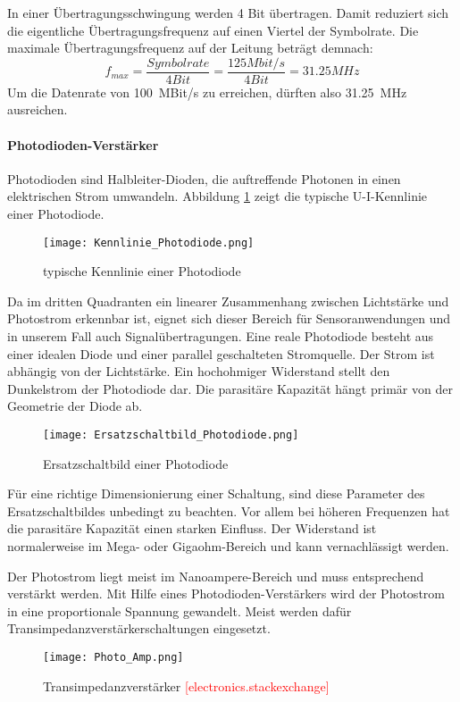 In einer Übertragungsschwingung werden 4 Bit übertragen. Damit reduziert sich die eigentliche Übertragungsfrequenz auf einen Viertel der Symbolrate. Die maximale Übertragungsfrequenz auf der Leitung beträgt demnach: 
\begin{equation}\label{eq:MLT3}
f_{max}=\frac{Symbolrate}{4 Bit}=\frac{125Mbit/s}{4 Bit}=31.25 MHz
\end{equation}
Um die Datenrate von \SI{100}{MBit/s} zu erreichen, dürften also \SI{31.25}{MHz} ausreichen.

\paragraph{Photodioden-Verstärker}
Photodioden sind Halbleiter-Dioden, die auftreffende Photonen in einen elektrischen Strom umwandeln. Abbildung \ref{fig:Kenn_Photodiode} zeigt die typische U-I-Kennlinie einer Photodiode.
\begin{figure}[h]
	\centering
	\texttt{[image: Kennlinie\_Photodiode.png]}
	\caption{typische Kennlinie einer Photodiode}\label{fig:Kenn_Photodiode}
\end{figure}
Da im dritten Quadranten ein linearer Zusammenhang zwischen Lichtstärke und Photostrom erkennbar ist, eignet sich dieser Bereich für Sensoranwendungen und in unserem Fall auch Signalübertragungen.
Eine reale Photodiode besteht aus einer idealen Diode und einer parallel geschalteten Stromquelle. Der Strom ist abhängig von der Lichtstärke. Ein hochohmiger Widerstand stellt den Dunkelstrom der Photodiode dar. Die parasitäre Kapazität hängt primär von der Geometrie der Diode ab.
 \begin{figure}[H]
 	\centering
 	\texttt{[image: Ersatzschaltbild\_Photodiode.png]}
 	\caption{Ersatzschaltbild einer Photodiode}\label{fig:Ersatz_Photodiode}
 \end{figure}
Für eine richtige Dimensionierung einer Schaltung, sind diese Parameter des Ersatzschaltbildes unbedingt zu beachten. Vor allem bei höheren Frequenzen hat die parasitäre Kapazität einen starken Einfluss. Der Widerstand ist normalerweise im Mega- oder Gigaohm-Bereich und kann vernachlässigt werden. \newline

Der Photostrom liegt meist im Nanoampere-Bereich und muss entsprechend verstärkt werden. Mit Hilfe eines Photodioden-Verstärkers wird der Photostrom in eine proportionale Spannung gewandelt. Meist werden dafür Transimpedanzverstärkerschaltungen eingesetzt.
\begin{figure}[h]
	\centering
	\texttt{[image: Photo\_Amp.png]}
	\caption{Transimpedanzverstärker \textcolor{red}{[electronics.stackexchange]}}\label{fig:Photo_Amp}
\end{figure}

